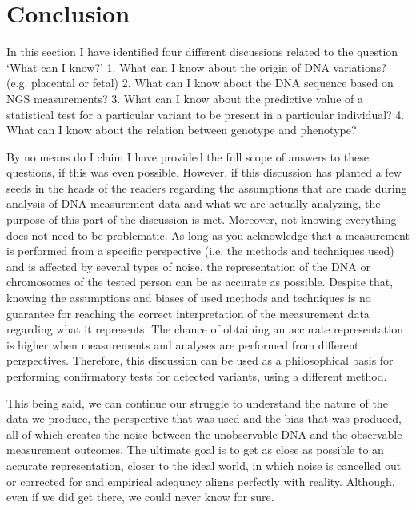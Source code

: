 \section{Conclusion} \label{Conclusion}
In this section I have identified four different discussions related to the question ‘What can I know?’
1.	What can I know about the origin of DNA variations? (e.g. placental or fetal)
2.	What can I know about the DNA sequence based on NGS measurements?
3.	What can I know about the predictive value of a statistical test for a particular variant to be present in a particular individual?
4.	What can I know about the relation between genotype and phenotype?

By no means do I claim I have provided the full scope of answers to these questions, if this was even possible. 
However, if this discussion has planted a few seeds in the heads of the readers regarding the assumptions that are made during analysis of DNA measurement data and what we are actually analyzing, the purpose of this part of the discussion is met. 
Moreover, not knowing everything does not need to be problematic. 
As long as you acknowledge that a measurement is performed from a specific perspective (i.e. the methods and techniques used) and is affected by several types of noise, the representation of the DNA or chromosomes of the tested person can be as accurate as possible. 
Despite that, knowing the assumptions and biases of used methods and techniques is no guarantee for reaching the correct interpretation of the measurement data regarding what it represents. 
The chance of obtaining an accurate representation is higher when measurements and analyses are performed from different perspectives. 
Therefore, this discussion can be used as a philosophical basis for performing confirmatory tests for detected variants, using a different method. 

This being said, we can continue our struggle to understand the nature of the data we produce, the perspective that was used and the bias that was produced, all of which creates the noise between the unobservable DNA and the observable measurement outcomes. 
The ultimate goal is to get as close as possible to an accurate representation, closer to the ideal world, in which noise is cancelled out or corrected for and empirical adequacy aligns perfectly with reality. 
Although, even if we did get there, we could never know for sure. 



